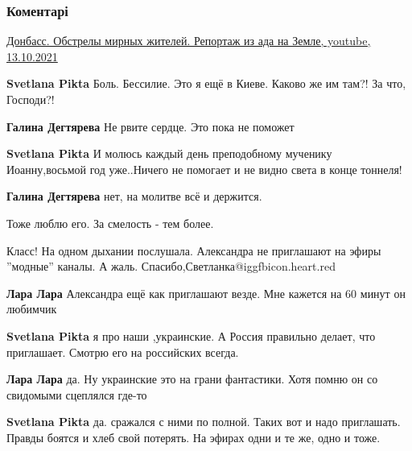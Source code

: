  
 
 
 
 
\subsubsection{Коментарі}
\label{sec:13_10_2021.fb.pikta_svetlana.3.donbass_semchenko.cmt}

\begin{itemize} %
\href{https://youtu.be/9xwd2_rjclY}{%
Донбасс. Обстрелы мирных жителей. Репортаж из ада на Земле, youtube, 13.10.2021%
}

\begin{itemize} %
\textbf{Svetlana Pikta} Боль. Бессилие. Это я ещё в Киеве. Каково же им там?! За что, Господи?!

\textbf{Галина Дегтярева} Не рвите сердце. Это пока не поможет

\textbf{Svetlana Pikta} И молюсь каждый день преподобному мученику Иоанну,восьмой год уже..Ничего не помогает и не видно света в конце тоннеля!

\textbf{Галина Дегтярева} нет, на молитве всё и держится.
\end{itemize} %

Тоже люблю его. За смелость - тем более.

Класс! На одном дыхании послушала. Александра не приглашают на эфиры ''модные'' каналы. А жаль. Спасибо,Светланка@igg{fbicon.heart.red}

\begin{itemize} %
\textbf{Лара Лара} Александра ещё как приглашают везде. Мне кажется на 60 минут он любимчик

\textbf{Svetlana Pikta} я про наши ,украинские. А Россия правильно делает, что приглашает. Смотрю его на российских всегда.

\textbf{Лара Лара} да. Ну украинские это на грани фантастики. Хотя помню он со свидомыми сцеплялся где-то

\textbf{Svetlana Pikta} да. сражался с ними по полной. Таких вот и надо приглашать. Правды боятся и хлеб свой потерять. На эфирах одни и те же, одно и тоже.
\end{itemize} %


\end{itemize}
